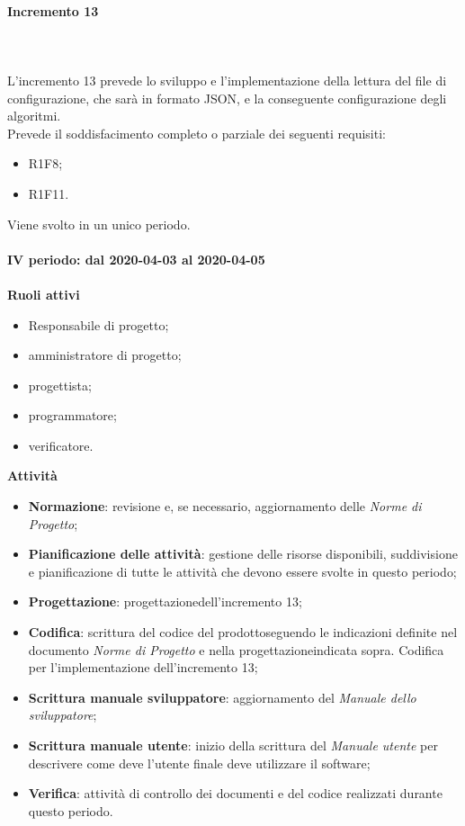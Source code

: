 \paragraph{Incremento 13} \mbox{} \\ \\
L'incremento 13 prevede lo sviluppo e l'implementazione della lettura del file di configurazione, che sarà in formato JSON, e la conseguente configurazione degli algoritmi.
\\Prevede il soddisfacimento completo o parziale dei seguenti requisiti:
\begin{itemize}
	\item R1F8;
	\item R1F11.
\end{itemize}
Viene svolto in un unico periodo.
\mbox{} \\ \\ \textbf{IV periodo: dal 2020-04-03 al 2020-04-05} \mbox{} \\ \\
\textbf{Ruoli attivi}
\begin{itemize}
	\item Responsabile di progetto\glo;
	\item amministratore di progetto\glo;
	\item progettista;
	\item programmatore;
	\item verificatore.
\end{itemize}
\textbf{Attività} 
\begin{itemize}
	\item \textbf{Normazione}: revisione e, se necessario, aggiornamento delle \textit{Norme di Progetto};
	\item \textbf{Pianificazione delle attività}: gestione delle risorse disponibili, suddivisione e pianificazione di tutte le attività che devono essere svolte in questo periodo;
	\item \textbf{Progettazione}\glo: progettazione\glosp dell'incremento 13;  
	\item \textbf{Codifica}: scrittura del codice del prodotto\glosp seguendo le indicazioni definite nel documento \textit{Norme di Progetto} e nella progettazione\glosp indicata sopra. Codifica per l'implementazione dell'incremento 13;
	\item \textbf{Scrittura manuale sviluppatore}: aggiornamento del \textit{Manuale dello sviluppatore};
	\item \textbf{Scrittura manuale utente}: inizio della scrittura del \textit{Manuale utente} per descrivere come deve l'utente finale deve utilizzare il software;
	\item \textbf{Verifica}: attività di controllo dei documenti e del codice realizzati durante questo periodo.
\end{itemize}
